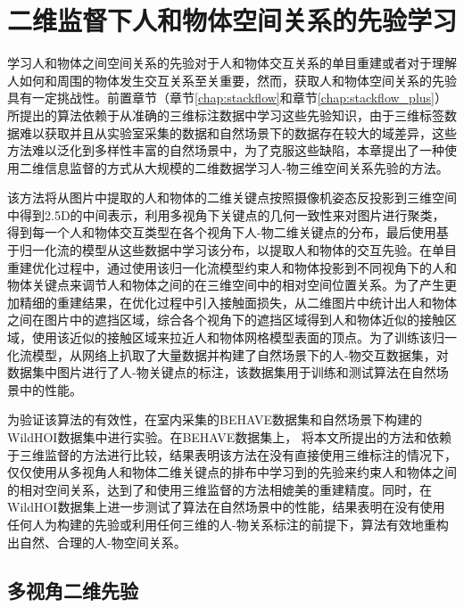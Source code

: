 \chapter{二维监督下人和物体空间关系的先验学习}\label{chap:super2d}
学习人和物体之间空间关系的先验对于人和物体交互关系的单目重建或者对于理解人如何和周围的物体发生交互关系至关重要，然而，获取人和物体空间关系的先验具有一定挑战性。前置章节（章节\ref{chap:stackflow}和章节\ref{chap:stackflow_plus}）所提出的算法依赖于从准确的三维标注数据中学习这些先验知识，由于三维标签数据难以获取并且从实验室采集的数据和自然场景下的数据存在较大的域差异，这些方法难以泛化到多样性丰富的自然场景中，为了克服这些缺陷，本章提出了一种使用二维信息监督的方式从大规模的二维数据学习人-物三维空间关系先验的方法。

该方法将从图片中提取的人和物体的二维关键点按照摄像机姿态反投影到三维空间中得到2.5D的中间表示，利用多视角下关键点的几何一致性来对图片进行聚类，得到每一个人和物体交互类型在各个视角下人-物二维关键点的分布，最后使用基于归一化流的模型从这些数据中学习该分布，以提取人和物体的交互先验。在单目重建优化过程中，通过使用该归一化流模型约束人和物体投影到不同视角下的人和物体关键点来调节人和物体之间的在三维空间中的相对空间位置关系。为了产生更加精细的重建结果，在优化过程中引入接触面损失，从二维图片中统计出人和物体之间在图片中的遮挡区域，综合各个视角下的遮挡区域得到人和物体近似的接触区域，使用该近似的接触区域来拉近人和物体网格模型表面的顶点。为了训练该归一化流模型，从网络上扒取了大量数据并构建了自然场景下的人-物交互数据集，对数据集中图片进行了人-物关键点的标注，该数据集用于训练和测试算法在自然场景中的性能。

为验证该算法的有效性，在室内采集的BEHAVE数据集和自然场景下构建的WildHOI数据集中进行实验。在BEHAVE数据集上，
将本文所提出的方法和依赖于三维监督的方法进行比较，结果表明该方法在没有直接使用三维标注的情况下，仅仅使用从多视角人和物体二维关键点的排布中学习到的先验来约束人和物体之间的相对空间关系，达到了和使用三维监督的方法相媲美的重建精度。同时，在WildHOI数据集上进一步测试了算法在自然场景中的性能，结果表明在没有使用任何人为构建的先验或利用任何三维的人-物关系标注的前提下，算法有效地重构出自然、合理的人-物空间关系。

\section{多视角二维先验}
